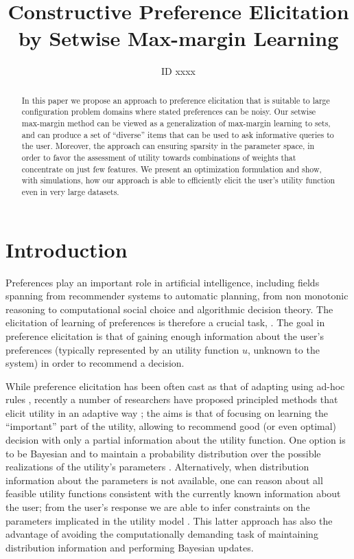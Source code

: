 \documentclass{article}
\title{Constructive Preference Elicitation by Setwise Max-margin Learning} %
\author{ID xxxx}
\renewcommand\[{\begin{equation}}
\renewcommand\]{\end{equation}}
\begin{document}
\maketitle

\begin{abstract}
In this paper we propose an approach to preference elicitation that is suitable to large
configuration problem domains where stated preferences can be noisy.
Our setwise max-margin method can be viewed as a generalization of max-margin learning to sets,
and can produce a set of ``diverse'' items that can be used to ask informative queries to the user.
Moreover, the approach can ensuring sparsity in the parameter space, in order to favor the assessment of utility towards combinations of weights that concentrate on just few features.
We present an optimization formulation and show, with simulations, how our approach is able to efficiently elicit the user's utility function even in very large datasets.


\end{abstract}

\section{Introduction}

Preferences \cite{Peintner2008} play an important role in artificial intelligence,
including fields spanning from recommender systems to automatic planning, 
from non monotonic reasoning to computational social choice and algorithmic decision theory.
The elicitation of learning of preferences is therefore a crucial task, .
The goal in preference elicitation is that of gaining enough information about the user's preferences (typically represented by an utility function $u$, unknown to the system) in order to recommend a decision.

While preference elicitation has been often cast as that of adapting using ad-hoc rules \cite{},
recently a number of researchers have proposed principled methods that elicit utility in an adaptive way \cite{chajewska2000,boutilier2002,Wang2003,boutilier2006,braziunas-mmr:uai07,guo2010real,viappiani2010optimal}; the aims is that of focusing on learning the ``important'' part of the utility, allowing to recommend good (or even optimal) decision with only a partial information about the utility function.
One option is to be Bayesian and to maintain a probability distribution over the possible realizations of the utility's parameters \cite{chajewska2000,boutilier2002,guo2010real,viappiani2010optimal}.
Alternatively, when distribution information about the parameters is not available, one can reason about all feasible utility functions consistent with the currently known information about the user; from the user's response we are able to infer constraints on the parameters implicated in the utility model \cite{Wang2003,boutilier2006,braziunasmmr:uai07,viappiani2009}.
This latter approach has also the advantage of avoiding the computationally demanding task of maintaining distribution information and performing Bayesian updates.
\end{document}

